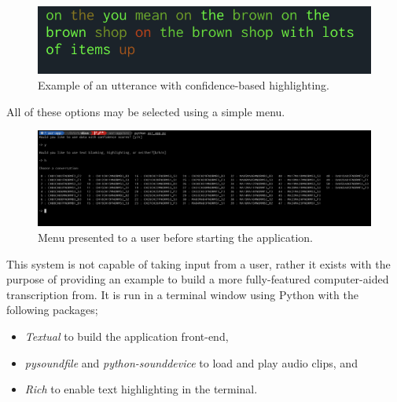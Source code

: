 \begin{figure}[h]
  \centering
  \includegraphics[width=\textwidth]{images/text-highlighting.png}
  \caption{Example of an utterance with confidence-based highlighting.}
  \label{fig:sys-highlighting}
\end{figure}

All of these options may be selected using a simple menu.

\begin{figure}[h]
  \centering
  \includegraphics[width=\textwidth]{images/menu.png}
  \caption{Menu presented to a user before starting the application.}
  \label{fig:sys-menu}
\end{figure}

This system is not capable of taking input from a user, rather it exists with the purpose of providing an example to build a more fully-featured computer-aided transcription from.
It is run in a terminal window using Python with the following packages;

\begin{itemize}
  \item \emph{Textual}\cite{textual} to build the application front-end,
  \item \emph{pysoundfile}\cite{pysoundfile} and \emph{python-sounddevice}\cite{pysounddevice} to load and play audio clips, and
  \item \emph{Rich}\cite{rich} to enable text highlighting in the terminal.
\end{itemize}
